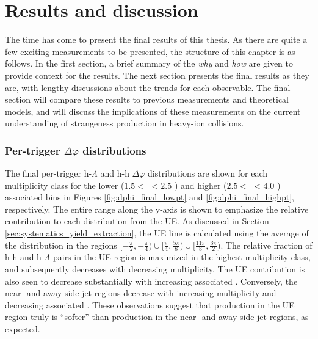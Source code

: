 \chapter{Results and discussion}
\label{chapter_results}

The time has come to present the final results of this thesis. As there are quite a few exciting measurements to be presented, the structure of this chapter is as follows. In the first section, a brief summary of the \textit{why} and \textit{how} are given to provide context for the results. The next section presents the final results as they are, with lengthy discussions about the trends for each observable. The final section will compare these results to previous measurements and theoretical models, and will discuss the implications of these measurements on the current understanding of strangeness production in heavy-ion collisions.


\subsection{Per-trigger $\Delta\varphi$ distributions}

The final per-trigger h-$\Lambda$ and h-h $\Delta\varphi$ distributions are shown for each multiplicity class for the lower ($1.5 <$ \pt $< 2.5$ \GeVc) and higher ($2.5 < $ \pt $< 4.0$ \GeVc) associated \pt bins in Figures \ref{fig:dphi_final_lowpt} and \ref{fig:dphi_final_highpt}, respectively. The entire range along the y-axis is shown to emphasize the relative contribution to each distribution from the UE. As discussed in Section \ref{sec:systematics_yield_extraction}, the UE line is calculated using the average of the distribution in the regions $[-\frac{\pi}{2}, -\frac{\pi}{4}) \cup [\frac{\pi}{4}, \frac{5\pi}{8}) \cup [\frac{11\pi}{8}, \frac{3\pi}{2})$. The relative fraction of h-h and h-$\Lambda$ pairs in the UE region is maximized in the highest multiplicity class, and subsequently decreases with decreasing multiplicity. The UE contribution is also seen to decrease substantially with increasing associated \pt. Conversely, the near- and away-side jet regions decrease with increasing multiplicity and decreasing associated \pt. These observations suggest that production in the UE region truly is ``softer'' than production in the near- and away-side jet regions, as expected.

